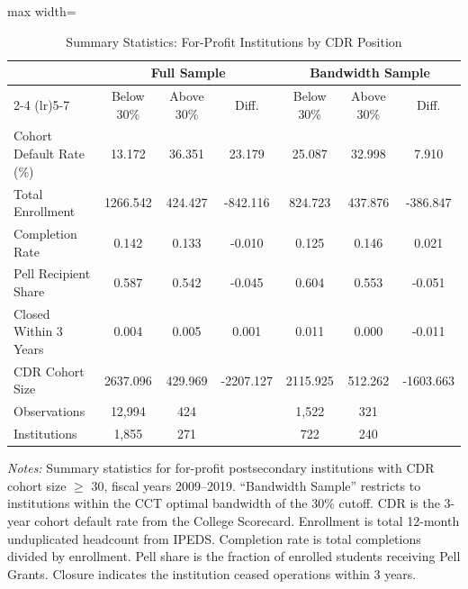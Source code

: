 \begin{table}[t]
\centering
\caption{Summary Statistics: For-Profit Institutions by CDR Position}
\label{tab:summary}
\small
\begin{adjustbox}{max width=\textwidth}
\begin{tabular}{lcccccc}
\toprule
 & \multicolumn{3}{c}{Full Sample} & \multicolumn{3}{c}{Bandwidth Sample} \\
\cmidrule(lr){2-4} \cmidrule(lr){5-7}
 & Below 30\% & Above 30\% & Diff. & Below 30\% & Above 30\% & Diff. \\
\midrule
Cohort Default Rate (\%) & 13.172 & 36.351 & 23.179 & 25.087 & 32.998 & 7.910 \\
Total Enrollment & 1266.542 & 424.427 & -842.116 & 824.723 & 437.876 & -386.847 \\
Completion Rate & 0.142 & 0.133 & -0.010 & 0.125 & 0.146 & 0.021 \\
Pell Recipient Share & 0.587 & 0.542 & -0.045 & 0.604 & 0.553 & -0.051 \\
Closed Within 3 Years & 0.004 & 0.005 & 0.001 & 0.011 & 0.000 & -0.011 \\
CDR Cohort Size & 2637.096 & 429.969 & -2207.127 & 2115.925 & 512.262 & -1603.663 \\
\midrule
Observations & 12,994 & 424 & & 1,522 & 321 & \\
Institutions & 1,855 & 271 & & 722 & 240 & \\
\bottomrule
\end{tabular}
\end{adjustbox}
\begin{minipage}{0.95\textwidth}
\vspace{0.5em}\footnotesize
\textit{Notes:} Summary statistics for for-profit postsecondary institutions with CDR cohort size $\geq$ 30, fiscal years 2009--2019. ``Bandwidth Sample'' restricts to institutions within the CCT optimal bandwidth of the 30\% cutoff. CDR is the 3-year cohort default rate from the College Scorecard. Enrollment is total 12-month unduplicated headcount from IPEDS. Completion rate is total completions divided by enrollment. Pell share is the fraction of enrolled students receiving Pell Grants. Closure indicates the institution ceased operations within 3 years.
\end{minipage}
\end{table}
